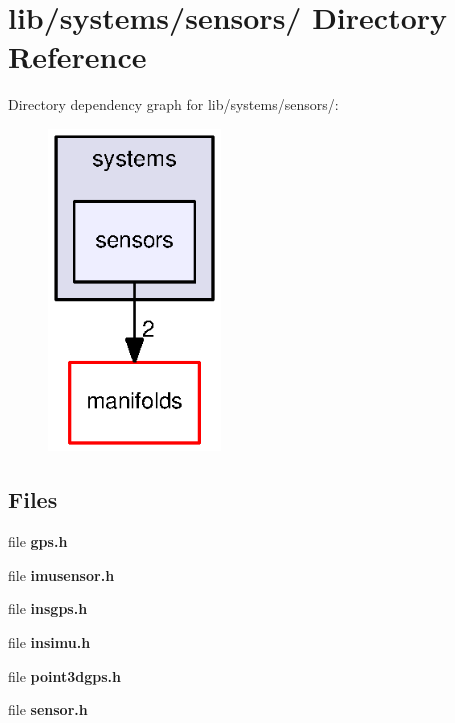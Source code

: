 \section{lib/systems/sensors/ \-Directory \-Reference}
\label{dir_08a164b35eb94898c15c8836174b9b0f}
\-Directory dependency graph for lib/systems/sensors/\-:\nopagebreak
\begin{figure}[H]
\begin{center}
\leavevmode
\includegraphics[width=130pt]{dir_08a164b35eb94898c15c8836174b9b0f_dep}
\end{center}
\end{figure}
\subsection*{\-Files}
\begin{DoxyCompactItemize}
\item 
file {\bf gps.\-h}
\item 
file {\bf imusensor.\-h}
\item 
file {\bf insgps.\-h}
\item 
file {\bf insimu.\-h}
\item 
file {\bf point3dgps.\-h}
\item 
file {\bf sensor.\-h}
\end{DoxyCompactItemize}
